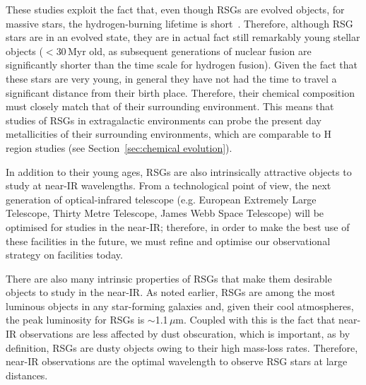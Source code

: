 These studies exploit the fact that, even though RSGs are evolved objects, for massive stars, the hydrogen-burning lifetime is short~\citep[just over 25\,Myr for a 8\,M$_{\odot}$ star and consequently shorter for higher-mass stars;][]{2012A&A...537A.146E}.
Therefore, although RSG stars are in an evolved state, they are in actual fact still remarkably young stellar objects ($<$30\,Myr old, as subsequent generations of nuclear fusion are significantly shorter than the time scale for hydrogen fusion).
Given the fact that these stars are very young, in general they have not had the time to travel a significant distance from their birth place.
Therefore, their chemical composition must closely match that of their surrounding environment.
This means that studies of RSGs in extragalactic environments can probe the present day metallicities of their surrounding environments, which are comparable to H\,\2 region studies (see Section~\ref{sec:chemical evolution}).

In addition to their young ages, RSGs are also intrinsically attractive objects to study at near-IR wavelengths.
From a technological point of view, the next generation of optical-infrared telescope (e.g. European Extremely Large Telescope, Thirty Metre Telescope, James Webb Space Telescope) will be optimised for studies in the near-IR; therefore, in order to make the best use of these facilities in the future, we must refine and optimise our observational strategy on facilities today.

There are also many intrinsic properties of RSGs that make them desirable objects to study in the near-IR.
As noted earlier, RSGs are among the most luminous objects in any star-forming galaxies and, given their cool atmospheres, the peak luminosity for RSGs is $\sim$1.1\,$\mu$m.
Coupled with this is the fact that near-IR observations are less affected by dust obscuration, which is important, as by definition, RSGs are dusty objects owing to their high mass-loss rates.
Therefore, near-IR observations are the optimal wavelength to observe RSG stars at large distances.

